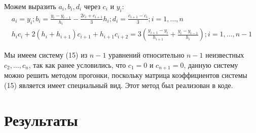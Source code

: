 \documentclass{article}
\begin{document}
\begin{description}
    Можем выразить \(a_i, b_i, d_i\) через \(c_i\) и \(y_i\):
    \begin{align}
    	a_i = y_i; b_i = \frac{y_i - y_{i-1}}{h_i} - \frac{2 c_i + c_{i+1}}{3} h_i; d_i = \frac{c_{i+1} - c_i}{3}; i = 1,\dots,n \\
    	h_i c_i + 2(h_i + h_{i+1}) c_{i+1} + h_{i+1} c_{i+2} = 3 (\frac{y_{i+1} - y_i}{h_{i+1}} + \frac{y_i - y_{i-1}}{h_i}); i = 1,\dots,n-1
    \end{align}
    
    Мы имеем систему (15) из \(n-1\) уравнений относительно \(n-1\) неизвестных \(c_2,\dots,c_n\), так как ранее условились, что \(c_1 = 0\) и \(c_{n+1} = 0\), данную систему можно решить методом прогонки, поскольку матрица коэффициентов системы (15) является имеет специальный вид. Этот метод был реализован в коде.
    
\end{description}

\section{Результаты}
\end{document}
